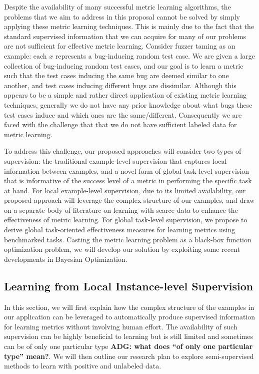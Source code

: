 Despite the availability of many successful metric learning
algorithms, the problems that we aim to address in this proposal
cannot be solved by simply applying these metric learning
techniques. This is mainly due to the fact that the standard
supervised information that we can acquire for many of our problems
are not sufficient for effective metric learning.  Consider fuzzer
taming as an example: each $x$ represents a bug-inducing random test
case. We are given a large collection of bug-inducing random test
cases, and our goal is to learn a metric such that the test cases
inducing the same bug are deemed similar to one another, and test
cases inducing different bugs are dissimilar. Although this appears to
be a simple and rather direct application of existing metric learning
techniques, generally we do not have any prior knowledge about what
bugs these test cases induce and which ones are the
same/different. Consequently we are faced with the challenge that that
we do not have sufficient labeled data for metric learning.

To address this challenge, our proposed approaches will consider two
types of supervision: the traditional example-level supervision that
captures local information between examples, and a novel form of
global task-level supervision that is informative of the success level
of a metric in performing the specific task at hand.  For local
example-level supervision, due to its limited availability, our
proposed approach will leverage the complex structure of our
examples, and draw on a separate body of literature on learning with
scarce data to enhance the effectiveness of metric learning. For
global task-level supervision, we propose to derive global
task-oriented effectiveness measures for learning metrics using
benchmarked tasks. Casting the metric learning problem as a black-box
function optimization problem, we will develop our solution by
exploiting some recent developments in Bayesian Optimization.

\subsection{Learning from Local Instance-level Supervision}
In this section, we will first explain how the complex structure of
the examples in our application can be leveraged to automatically
produce supervised information for learning metrics without involving
human effort.  The availability of such supervision can be highly
beneficial to learning but is still limited and sometimes can be of
only one particular type {\bf ADG: what does ``of only one particular
type'' mean?}. We will then outline our research plan to explore
semi-supervised methods to learn with positive and unlabeled data.

